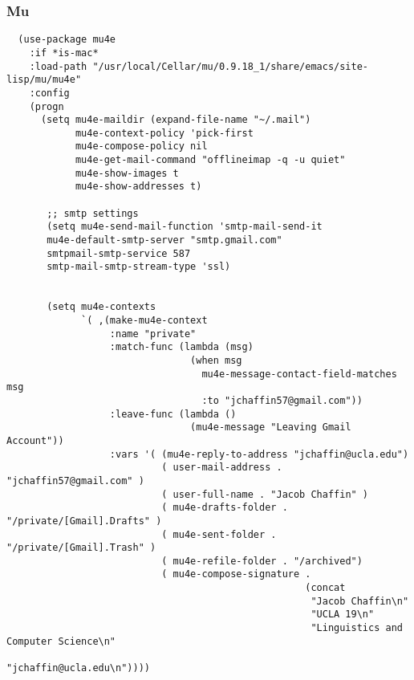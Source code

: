 \documentclass[11pt]{article}
\begin{document}
\subsubsection*{Mu}
\label{sec:org4156924}

\begin{verbatim}
  (use-package mu4e
    :if *is-mac*
    :load-path "/usr/local/Cellar/mu/0.9.18_1/share/emacs/site-lisp/mu/mu4e"
    :config
    (progn
      (setq mu4e-maildir (expand-file-name "~/.mail")
            mu4e-context-policy 'pick-first
            mu4e-compose-policy nil
            mu4e-get-mail-command "offlineimap -q -u quiet"
            mu4e-show-images t
            mu4e-show-addresses t)

       ;; smtp settings
       (setq mu4e-send-mail-function 'smtp-mail-send-it
       mu4e-default-smtp-server "smtp.gmail.com"
       smtpmail-smtp-service 587
       smtp-mail-smtp-stream-type 'ssl)


       (setq mu4e-contexts
             `( ,(make-mu4e-context
                  :name "private"
                  :match-func (lambda (msg)
                                (when msg
                                  mu4e-message-contact-field-matches msg
                                  :to "jchaffin57@gmail.com"))
                  :leave-func (lambda ()
                                (mu4e-message "Leaving Gmail Account"))
                  :vars '( (mu4e-reply-to-address "jchaffin@ucla.edu")
                           ( user-mail-address . "jchaffin57@gmail.com" )
                           ( user-full-name . "Jacob Chaffin" )
                           ( mu4e-drafts-folder . "/private/[Gmail].Drafts" )
                           ( mu4e-sent-folder . "/private/[Gmail].Trash" )
                           ( mu4e-refile-folder . "/archived")
                           ( mu4e-compose-signature .
                                                    (concat
                                                     "Jacob Chaffin\n"
                                                     "UCLA 19\n"
                                                     "Linguistics and Computer Science\n"
                                                     "jchaffin@ucla.edu\n"))))


\end{verbatim}
\end{document}
